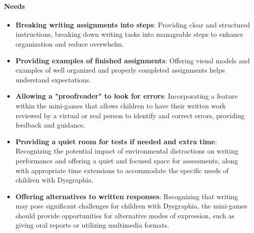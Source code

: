 \paragraph{Needs}
\begin{itemize}
    \item \textbf{Breaking writing assignments into steps}: Providing clear and structured instructions, breaking down writing tasks into manageable steps to enhance organization and reduce overwhelm.
    \item \textbf{Providing examples of finished assignments}: Offering visual models and examples of well organized and properly completed assignments helps understand expectations.
    \item \textbf{Allowing a "proofreader" to look for errors}: Incorporating a feature within the mini-games that allows children to have their written work reviewed by a virtual or real person to identify and correct errors, providing feedback and guidance.
    \item \textbf{Providing a quiet room for tests if needed and extra time}: Recognizing the potential impact of environmental distractions on writing performance and offering a quiet and focused space for assessments, along with appropriate time extensions to accommodate the specific needs of children with Dysgraphia.
    \item \textbf{Offering alternatives to written responses}: Recognizing that writing may pose significant challenges for children with Dysgraphia, the mini-games should provide opportunities for alternative modes of expression, such as giving oral reports or utilizing multimedia formats.
\end{itemize}

